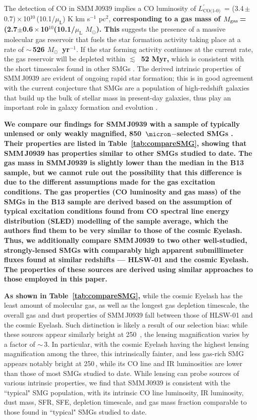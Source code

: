 \documentclass[iop, revtex4]{emulateapj}
\newcommand{\Msun}{\mbox{$M_{\odot}$}}
\newcommand{\Lp}{\mbox{$L^{\prime}_\textrm{CO(1-0)}$}}
\newcommand{\LpU}{\mbox{K\,\,km\,\,s$^{-1}$\,\,pc$^2$}}
\newcommand{\eg}{{\sl e.g.,~}}
\newcommand{\pmOne}{\mbox{$^{-1}$}}
\begin{document}
The detection of CO in SMM\,J0939
implies a CO luminosity of \Lp\ = (3.4\,$\pm$\,0.7)\,$\times$\,10$^{10}$\,(10.1/$\mu_\textrm{L}$) \LpU, {\bf corresponding to a gas mass of 
$M_{\rm gas}$\,=\,(2.7$\pm$0.6\,$\times$\,10$^{10}$(10.1/$\mu_\textrm{L}$ $\Msun$).
This }
suggests the presence of a massive
molecular gas reservoir that fuels the star formation activity taking place at a rate of {\bf $\sim$\,526 \Msun~yr\pmOne}. If the star forming activity continues at the current rate, the gas reservoir will be depleted within {\bf $\lesssim$~52 Myr,}
which is consistent with the short timescales found in other SMGs \citep{Greve05a}. The derived intrinsic properties of SMM\,J0939 are evident of ongoing rapid star formation; this is in good agreement with the current conjecture that SMGs are a 
population of high-redshift galaxies that build up the bulk of stellar mass in present-day galaxies, thus play an important role
in galaxy formation and evolution \citep[\eg ][]{Dickinson03a}.

{\bf We
compare our findings for SMM\,J0939 
with a sample of typically unlensed or only weakly magnified, 850~$\micron$$-$selected SMGs \citep[][hereafter B13]{Bothwell13a}. 
Their properties are listed in Table~\ref{tab:compareSMG}, showing that SMM\,J0939 has properties similar
to other SMGs studied to date. 
The gas mass in SMM\,J0939 is slightly lower than the median in the B13 sample, but we cannot rule out the possibility that this difference is due to the different assumptions made for the gas excitation conditions. 
The gas properties (CO luminosity and gas mass) of the SMGs in the B13 sample are derived based on the assumption of typical excitation conditions found from CO spectral line energy distribution (SLED) modelling of the sample average, which the authors find them to be very similar to those of the cosmic Eyelash. Thus, we additionally compare SMM\,J0939 to two other well-studied, strongly-lensed SMGs
with comparably high apparent submillimeter fluxes
found at similar redshifts --- HLSW-01 and the cosmic Eyelash.
The properties of these sources are derived using similar approaches to those employed in this paper. 
}

{\bf As shown in Table~\ref{tab:compareSMG},} while the cosmic Eyelash has the least amount of molecular gas, as well as
the
longest gas depletion timescale, the overall gas and dust properties of SMM\,J0939 fall between those of HLSW-01 and the
cosmic
Eyelash. Such distinction is likely a result of our selection bias: while these sources appear similarly bright at 250~\micron, the lensing magnification
varies by a factor of $\sim$\,3. In particular, with the cosmic Eyelash having the highest lensing magnification among the
three, this
intrinsically fainter, and less gas-rich SMG appears notably bright
at 250\,\micron, while its CO line and IR luminosities are lower than those of most SMGs studied to date.
While lensing can probe sources
of various intrinsic properties, we find that 
SMM\,J0939 is consistent with the ``typical" SMG population, with its intrinsic CO line luminosity, IR luminosity, 
dust mass, SFR, SFE, depletion timescale, and gas mass fraction comparable to those found in ``typical" SMGs studied to date.
\end{document}

